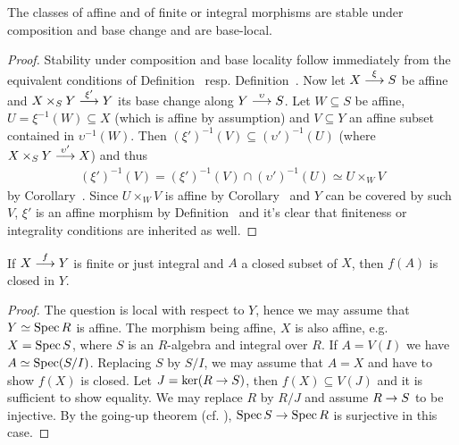 \documentclass[a4paper,parskip=half,numbers=enddot, DIV=12]{scrreprt}
\begin{document}
\begin{cor}
    The classes of affine and of finite or integral morphisms are stable under composition and base change and are base-local.
\end{cor}
\begin{proof}
	Stability under composition and base locality follow immediately from the equivalent conditions of Definition~ resp. Definition~. Now let $X\morphism[\xi]S$ be affine and $X\times_SY\morphism[\xi']Y$ its base change along $Y\morphism[\upsilon] S$. Let $W\subseteq S$ be affine, $U=\xi^{-1}(W)\subseteq X$ (which is affine by assumption) and $V\subseteq Y$ an affine subset contained in $\upsilon^{-1}(W)$. Then $(\xi')^{-1}(V)\subseteq(\upsilon')^{-1}(U)$ (where $X\times_SY\morphism[\upsilon']X$) and thus
	\begin{align*}
		(\xi')^{-1}(V)=(\xi')^{-1}(V)\cap (\upsilon')^{-1}(U)\simeq U\times_WV
	\end{align*}
	by Corollary~. Since $U\times_WV$ is affine by Corollary~ and $Y$ can be covered by such $V$, $\xi'$ is an affine morphism by Definition~ and it's clear that finiteness or integrality conditions are inherited as well.
\end{proof}
\begin{prop}
    If $X\morphism[f] Y$ is finite or just integral and $A$ a closed subset of $X$, then $f(A)$ is closed in $Y$.
\end{prop}
\begin{proof}
    The question is local with respect to $Y$, hence we may assume that $Y\simeq \operatorname{Spec} R$ is affine. The morphism being affine, $X$ is also affine, e.g.\ $X= \operatorname{Spec} S$, where $S$ is an $R$-algebra and integral over $R$. If $A=V(I)$ we have $A\simeq \operatorname{Spec}(S/I)$. Replacing $S$ by $S/I$, we may assume that $A=X$ and have to show $f(X)$ is closed. Let $J = \ker(R\morphism S)$, then $f(X)\subseteq V(J)$ and it is sufficient to show equality. We may replace $R$ by $R/J$ and assume $R\morphism S$ to be injective. By the going-up theorem (cf. \cite[Theorem~7]{alg1}), $\Spec S\morphism \Spec R$ is surjective in this case. 
\end{proof}
\end{document}
